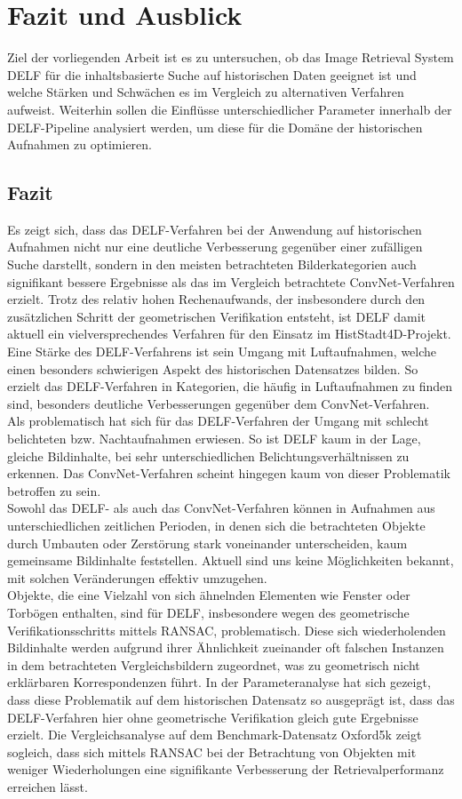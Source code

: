 \chapter{Fazit und Ausblick}

Ziel der vorliegenden Arbeit ist es zu untersuchen, ob das Image Retrieval System DELF für die inhaltsbasierte Suche auf historischen Daten geeignet ist und welche Stärken und Schwächen es im Vergleich zu alternativen Verfahren aufweist. Weiterhin sollen die Einflüsse unterschiedlicher Parameter innerhalb der DELF-Pipeline analysiert werden, um diese für die Domäne der historischen Aufnahmen zu optimieren.
\section{Fazit}
Es zeigt sich, dass das DELF-Verfahren bei der Anwendung auf historischen Aufnahmen nicht nur eine deutliche Verbesserung gegenüber einer zufälligen Suche darstellt, sondern in den meisten betrachteten Bilderkategorien auch signifikant bessere Ergebnisse als das im Vergleich betrachtete ConvNet-Verfahren erzielt. Trotz des relativ hohen Rechenaufwands, der insbesondere durch den zusätzlichen Schritt der geometrischen Verifikation entsteht, ist DELF damit aktuell ein vielversprechendes Verfahren für den Einsatz im HistStadt4D-Projekt.
\\
Eine Stärke des DELF-Verfahrens ist sein Umgang mit Luftaufnahmen, welche einen besonders schwierigen Aspekt des historischen Datensatzes bilden. So erzielt das DELF-Verfahren in Kategorien, die häufig in Luftaufnahmen zu finden sind, besonders deutliche Verbesserungen gegenüber dem ConvNet-Verfahren. 
\\
Als problematisch hat sich für das DELF-Verfahren der Umgang mit schlecht belichteten bzw. Nachtaufnahmen erwiesen. So ist DELF kaum in der Lage, gleiche Bildinhalte, bei sehr unterschiedlichen Belichtungsverhältnissen zu erkennen. Das ConvNet-Verfahren scheint hingegen kaum von dieser Problematik betroffen zu sein.
\\
Sowohl das DELF- als auch das ConvNet-Verfahren können in Aufnahmen aus unterschiedlichen zeitlichen Perioden, in denen sich die betrachteten Objekte durch Umbauten oder Zerstörung stark voneinander unterscheiden, kaum gemeinsame Bildinhalte feststellen. Aktuell sind uns keine Möglichkeiten bekannt, mit solchen Veränderungen effektiv umzugehen.
\\
Objekte, die eine Vielzahl von sich ähnelnden Elementen wie Fenster oder Torbögen enthalten, sind für DELF, insbesondere wegen des geometrische Verifikationsschritts mittels RANSAC, problematisch. Diese sich wiederholenden Bildinhalte werden aufgrund ihrer Ähnlichkeit zueinander oft falschen Instanzen in dem betrachteten Vergleichsbildern zugeordnet, was zu geometrisch nicht erklärbaren Korres\-pondenzen führt. In der Parameteranalyse hat sich gezeigt, dass diese Problematik auf dem historischen Datensatz so ausgeprägt ist, dass das DELF-Verfahren hier ohne geometrische Verifikation gleich gute Ergebnisse erzielt. Die Vergleichsanalyse auf dem Benchmark-Datensatz Oxford5k zeigt sogleich, dass sich mittels RANSAC bei der Betrachtung von Objekten mit weniger Wiederholungen eine signifikante Verbesserung der Retrievalperformanz erreichen lässt. 
